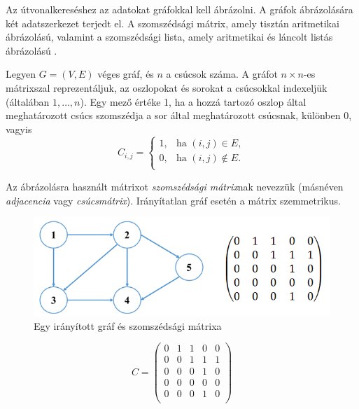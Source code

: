 

Az útvonalkereséshez az adatokat gráfokkal kell ábrázolni. A gráfok ábrázolására két adatszerkezet terjedt el. A szomszédsági mátrix, amely tisztán aritmetikai ábrázolású, valamint a szomszédsági lista, amely aritmetikai és láncolt listás ábrázolású \cite{grafabrazolas}.


Legyen $G = (V,E)$ véges gráf, és $n$ a csúcsok száma. A gráfot $n \times n$-es mátrixszal reprezentáljuk, az oszlopokat és sorokat a csúcsokkal indexeljük (általában $1, \ldots, n$). Egy mező értéke 1, ha a hozzá tartozó oszlop által meghatározott csúcs szomszédja a sor által meghatározott csúcsnak, különben 0, vagyis
$$
C_{i, j} = \begin{cases}
    1, & \text{ha } (i, j) \in E, \\
    0, & \text{ha } (i, j) \notin E. \\
\end{cases}
$$

Az ábrázolásra használt mátrixot \textit{szomszédsági mátrix}nak nevezzük (másnéven \textit{adjacencia} vagy \textit{csúcsmátrix}). Irányítatlan gráf esetén a mátrix szemmetrikus.


\begin{figure}[htb]
\centering
\includegraphics[scale=0.8]{kepek/szomszedsagi_graf_matrix.png}
\caption{Egy irányított gráf és szomszédsági mátrixa}
\label{fig:szomszedsagi_graf_matrix}
\end{figure}

$$
C =
\left(
\begin{array}{ccccc}
0 & 1 & 1 & 0 & 0 \\
0 & 0 & 1 & 1 & 1 \\
0 & 0 & 0 & 1 & 0 \\
0 & 0 & 0 & 0 & 0 \\
0 & 0 & 0 & 1 & 0 \\
\end{array}
\right)
$$

